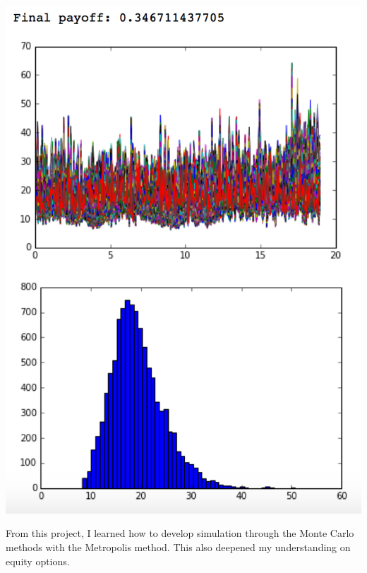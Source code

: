 \documentclass{article}
\begin{document}
\begin{enumerate}
\includegraphics[scale=0.3,center]{toymodel}

\end{enumerate}
From this project, I learned how to develop simulation through the Monte Carlo methods with the Metropolis method. This also deepened my understanding on equity options.
\end{document}
